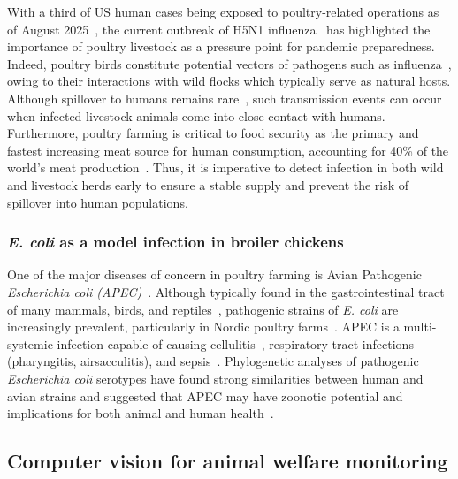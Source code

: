 With a third of US human cases being exposed to poultry-related operations as of August 2025~\cite{cdc2025}, the current outbreak of H5N1 influenza~\cite{xie2023} has highlighted the importance of poultry livestock as a pressure point for pandemic preparedness. Indeed, poultry birds constitute potential vectors of pathogens such as influenza~\cite{capua2006, swayne2025}, owing to their interactions with wild flocks which typically serve as natural hosts. Although spillover to humans remains rare~\cite{swayne2025}, such transmission events can occur when infected livestock animals come into close contact with humans. Furthermore, poultry farming is critical to food security as the primary and fastest increasing meat source for human consumption, accounting for 40\% of the world's meat production~\cite{oecd2025}. Thus, it is imperative to detect infection in both wild and livestock herds early to ensure a stable supply and prevent the risk of spillover into human populations.  

\subsubsection{\textit{E. coli} as a model infection in broiler chickens}

One of the major diseases of concern in poultry farming is Avian Pathogenic \textit{Escherichia coli (APEC)}~\cite{nolan2020}. Although typically found in the gastrointestinal tract of many mammals, birds, and reptiles~\cite{tenaillon2010}, pathogenic strains of \textit{E. coli} are increasingly prevalent, particularly in Nordic poultry farms~\cite{ronco2017, kromann2023}. APEC is a multi-systemic infection capable of causing cellulitis~\cite{poulsen2018}, respiratory tract infections (pharyngitis, airsacculitis), and sepsis~\cite{dho1999, stromberg2017}. Phylogenetic analyses of pathogenic \textit{Escherichia coli} serotypes have found strong similarities between human and avian strains and suggested that APEC may have zoonotic potential and implications for both animal and human health~\cite{moulin2007, stromberg2017}.

\subsection{Computer vision for animal welfare monitoring}

